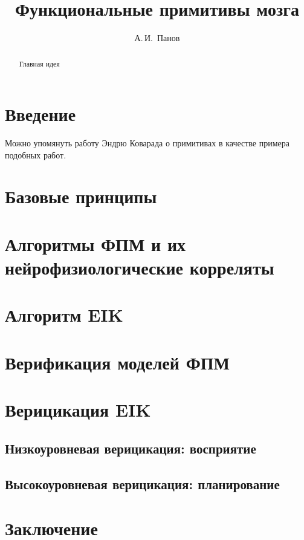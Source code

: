 \documentclass[a4paper,12pt]{article}
\begin{document}
	\title{Функциональные примитивы мозга}
	\author{А.\,И.~Панов}
	
	\maketitle{}
	
	\begin{abstract}
		Главная идея
	\end{abstract}
	
	\section*{Введение}
	Можно упомянуть работу Эндрю Коварада \cite{Coward2014} о примитивах в качестве примера подобных работ.
	
	\section{Базовые принципы}
	
	\section{Алгоритмы ФПМ и их нейрофизиологические корреляты}
	
	\section{Алгоритм EIK}
	
	\section{Верификация моделей ФПМ}
	
	\section{Верицикация EIK}
	\subsection{Низкоуровневая верицикация: восприятие}
	\subsection{Высокоуровневая верицикация: планирование}
	
	\section*{Заключение}
	
    
    
\end{document}

